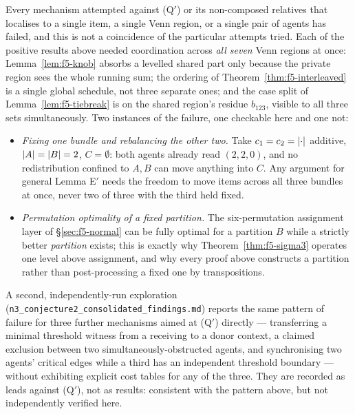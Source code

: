 \begin{remark}
\label{rem:f5-local-fail}
Every mechanism attempted against (Q$'$) or its non-composed relatives that
localises to a single item, a single Venn region, or a single pair of agents has
failed, and this is not a coincidence of the particular attempts tried. Each of
the positive results above needed coordination across \emph{all seven} Venn
regions at once: Lemma~\ref{lem:f5-knob} absorbs a levelled shared part only
because the private region sees the whole running sum; the ordering of
Theorem~\ref{thm:f5-interleaved} is a single global schedule, not three separate
ones; and the case split of Lemma~\ref{lem:f5-tiebreak} is on the shared
region's residue $b_{123}$, visible to all three sets simultaneously. Two
instances of the failure, one checkable here and one not:
\begin{itemize}
\item \emph{Fixing one bundle and rebalancing the other two.} Take
  $c_1 = c_2 = \left\lvert\cdot\right\rvert$ additive, $\left\lvert A\right\rvert = \left\lvert B\right\rvert = 2$, $C =
  \emptyset$: both agents already read $(2,2,0)$, and no redistribution confined
  to $A,B$ can move anything into $C$. Any argument for general Lemma E$'$ needs
  the freedom to move items across all three bundles at once, never two of three
  with the third held fixed.
\item \emph{Permutation optimality of a fixed partition.} The six-permutation
  assignment layer of \S\ref{sec:f5-normal} can be fully optimal for a
  partition $B$ while a strictly better \emph{partition} exists; this is exactly
  why Theorem~\ref{thm:f5-sigma3} operates one level above assignment, and why
  every proof above constructs a partition rather than post-processing a fixed
  one by transpositions.
\end{itemize}
A second, independently-run exploration
(\texttt{n3\_conjecture2\_consolidated\_findings.md}) reports the same pattern
of failure for three further mechanisms aimed at (Q$'$) directly --- transferring
a minimal threshold witness from a receiving to a donor context, a claimed
exclusion between two simultaneously-obstructed agents, and synchronising two
agents' critical edges while a third has an independent threshold boundary ---
without exhibiting explicit cost tables for any of the three. They are recorded
as leads against (Q$'$), not as results: consistent with the pattern above, but
not independently verified here.
\end{remark}


